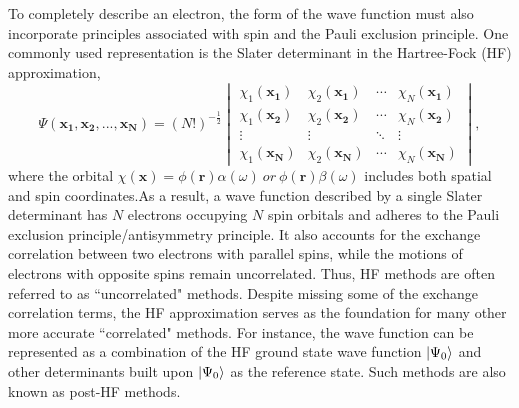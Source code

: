 To completely describe an electron, the form of the wave function must also incorporate principles associated with spin and the Pauli exclusion principle.\cite{Pauli1925} One commonly used representation is the Slater determinant in the Hartree-Fock (HF) approximation,\cite{Slater1951, Szabo2012}
\begin{equation}
\Psi(\mathbf{x_{1}}, \mathbf{x_{2}}, ..., \mathbf{x_{N}})=(N!)^{-\frac{1}{2}}
\begin{vmatrix}
\chi_{1}(\mathbf{x_{1}}) & \chi_{2}(\mathbf{x_{1}}) & \cdots & \chi_{N}(\mathbf{x_{1}}) \\
\chi_{1}(\mathbf{x_{2}}) & \chi_{2}(\mathbf{x_{2}}) & \cdots & \chi_{N}(\mathbf{x_{2}}) \\
\vdots & \vdots & \ddots & \vdots \\
\chi_{1}(\mathbf{x_{N}}) & \chi_{2}(\mathbf{x_{N}}) & \cdots & \chi_{N}(\mathbf{x_{N}})
\end{vmatrix}, 
\end{equation}
where the orbital $\chi(\mathbf{x})=\phi(\mathbf{r})\alpha(\omega) \ or \ \phi(\mathbf{r})\beta(\omega)$ includes both spatial and spin coordinates.As a result, a wave function described by a single Slater determinant has $N$ electrons occupying $N$ spin orbitals and adheres to the Pauli exclusion principle/antisymmetry principle. It also accounts for the exchange correlation between two electrons with parallel spins, while the motions of electrons with opposite spins remain uncorrelated. Thus, HF methods are often referred to as ``uncorrelated" methods. Despite missing some of the exchange correlation terms, the HF approximation serves as the foundation for many other more accurate ``correlated" methods. For instance, the wave function can be represented as a combination of the HF ground state wave function $| \Psi_{0} \rangle$ and other determinants built upon $| \Psi_{0} \rangle$ as the reference state. Such methods are also known as post-HF methods.

